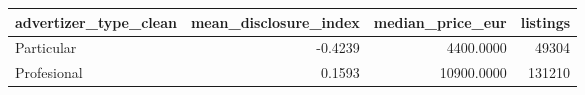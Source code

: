 \begin{tabular}{lrrr}
\toprule
advertizer\_type\_clean & mean\_disclosure\_index & median\_price\_eur & listings \\
\midrule
Particular & -0.4239 & 4400.0000 & 49304 \\
Profesional & 0.1593 & 10900.0000 & 131210 \\
\bottomrule
\end{tabular}
